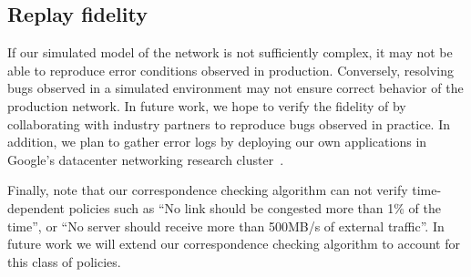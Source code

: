 \subsection{Replay fidelity}

If our simulated model of the network is not sufficiently complex, it may not
be able to reproduce error conditions observed in production. Conversely,
resolving bugs observed in a simulated environment may not ensure
correct behavior of the production network. In future work, we hope to verify
the fidelity of \simulator{} by collaborating with industry partners to
reproduce bugs observed in practice. In addition, we
plan to gather error logs by deploying our own applications in Google's
datacenter networking research cluster~\cite{DNRC}.

Finally, note that our correspondence checking algorithm can not verify 
time-dependent policies such as ``No link should be congested more than 1\% of the
time'', or ``No server should receive more than 500MB/s of external traffic''.
In future work we will extend our correspondence checking algorithm to
account for this class of policies.
